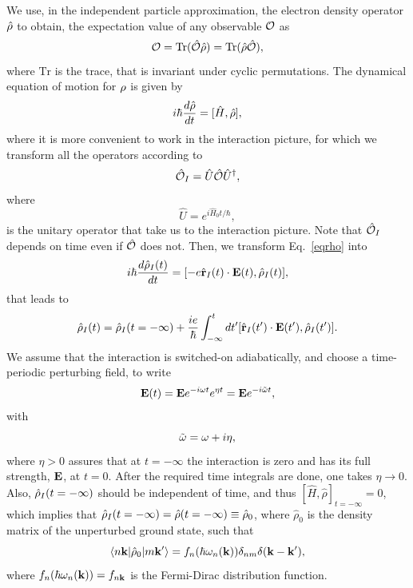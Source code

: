\documentclass{article}
\begin{document}
We use, in the independent particle approximation, the electron density
operator $\hat{{\rho}}$ to obtain, the expectation value of any observable
${\cal O}$ as
\begin{equation}\label{traza}
  {\cal O}=\mathrm{Tr}(\hat{{\cal O}}\hat\rho)=\mathrm{Tr}(\hat\rho\hat{{\cal O}}),
\end{equation}
where $\mathrm{Tr}$ is the trace, that is
invariant under cyclic permutations.
The dynamical equation of motion for ${\rho}$ is given by
\begin{equation}\label{eqrho}
i\hbar \frac{d\hat{{\rho}}}{dt}=[\hat{H},\hat{{\rho}}]
,
\end{equation}
where it is more convenient to work in the interaction picture, for
which we transform all the operators according to 
\begin{equation}\label{ip}
\hat{{\cal O}}_I=\hat{U}\hat{{\cal O}}\hat{U}^\dagger,
\end{equation}
where
\begin{equation}\label{ou}
\hat{U}=e^{i\hat{H}_0t/\hbar},
\end{equation}
is the unitary operator that take us to the interaction picture.
Note that $\hat{{\cal O}}_I$ depends on time even if $\hat{{\cal O}}$ does not.
Then, we transform Eq.~\eqref{eqrho} into
\begin{equation}\label{intrho}
i\hbar\frac{d\hat{{\rho}}_I(t)}{dt}=[-e\hat{\mathbf{r}}_I(t)\cdot\mathbf{E}(t),\hat{{\rho}}_I(t)],
\end{equation}
that leads to
\begin{equation}\label{intrho2}
\hat{{\rho}}_I(t)=\hat{{\rho}}_I(t=-\infty)
+
\frac{ie}{\hbar}\int_{-\infty}^t dt'[\hat{\mathbf{r}}_I(t')\cdot\mathbf{E}(t'),\hat{{\rho}}_I(t')].
\end{equation}
We assume that the interaction is switched-on adiabatically, and
choose a time-periodic perturbing field, to write
\begin{equation}\label{efield}
\mathbf{E}(t)=\mathbf{E} e^{-i\omega t}e^{\eta t}=\mathbf{E} e^{-i\tilde\omega t}
,
\end{equation}
with
\begin{equation}\label{got}
\tilde\omega=\omega+i\eta
,
\end{equation} 
where $\eta > 0$ assures
that at $t=-\infty$ the interaction is zero and has its full strength, $\mathbf{E}$,
at $t=0$. After the required time integrals are done, one takes
$\eta\to 0$. 
Also, $\hat{{\rho}}_I(t=-\infty)$ should be independent of time, and thus 
$[\hat{H},\hat\rho]_{t=-\infty}=0$, which implies that 
$\hat{{\rho}}_I(t=-\infty)=\hat\rho(t=-\infty)\equiv\hat\rho_0$,
where $\hat\rho_0$ is
the density matrix of the unperturbed ground state,
such that
\begin{equation}\label{nrhon}
\langle n\mathbf{k} |\hat{{\rho}}_0| m\mathbf{k}' \rangle=f_n(\hbar\omega_n(\mathbf{k}))\delta_{nm}\delta(\mathbf{k}-\mathbf{k}')
,
\end{equation}
where $f_n(\hbar\omega_n(\mathbf{k}))=f_{n\mathbf{k}}$ is the Fermi-Dirac distribution function.
\end{document}
